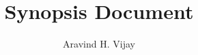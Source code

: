 
\title{Synopsis Document}
\author{Aravind H. Vijay}


    \maketitle
    \tableofcontents
    \thispagestyle{empty}
    \nocite{*}
%	
    \printbibliography


